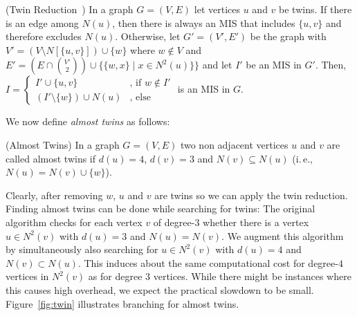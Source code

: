 \documentclass[a4paper,UKenglish,cleveref, autoref, thm-restate]{lipics-v2021}
\newcommand{\ie}{i.\,e.,\xspace}
\begin{document}
\begin{theorem} (Twin Reduction~\cite{XiaoUnconfined}) In a graph $G=(V,E)$ let
  vertices $u$ and $v$ be twins. If there is an edge among $N(u)$, then there is
  always an MIS that includes $\{u,v\}$ and therefore
  excludes $N(u)$. Otherwise, let $G'=(V',E')$ be the graph with $V'=(V\setminus
  N[\{u,v\}])\cup\{w\}$ where $w\notin V$ and $E'=(E\cap\binom{V'}{2})\cup
  \{\{w,x\}\;|\;x\in N^2(u)\}\}$ and let $I'$ be an MIS in $G'$. Then, 
  $
  I=\begin{cases}
    I'\cup \{u,v\} & \text{, if }w\notin I'\\
    (I'\setminus \{w\})\cup N(u) & \text{, else} %
  \end{cases}
  $
  is an MIS in $G$.
\end{theorem}

We now define \emph{almost twins} as follows:
\begin{definition} (Almost Twins)
  In a graph $G=(V,E)$ two non adjacent vertices $u$ and $v$ are called almost twins if $d(u) = 4$, $d(v) = 3$ and $N(v)\subseteq N(u)$ (\ie $N(u) = N(v) \cup \{w\}$). 
\end{definition}

Clearly, after removing $w$, $u$ and $v$ are twins so we can apply the twin
reduction. Finding almost twins can be done while searching for twins: The
original algorithm checks for each vertex $v$ of degree-$3$ whether there is a
vertex $u \in N^2(v)$ with $d(u) = 3$ and $N(u) = N(v)$. We augment this
algorithm by simultaneously also searching for $u \in N^2(v)$ with $d(u) = 4$
and $N(v) \subset N(u)$. This induces about the same computational cost for
degree-$4$ vertices in $N^2(v)$ as for degree $3$ vertices. While there might be
instances where this causes high overhead, we expect the practical slowdown to
be small. Figure~\ref{fig:twin} illustrates branching for almost twins. 
\end{document}
